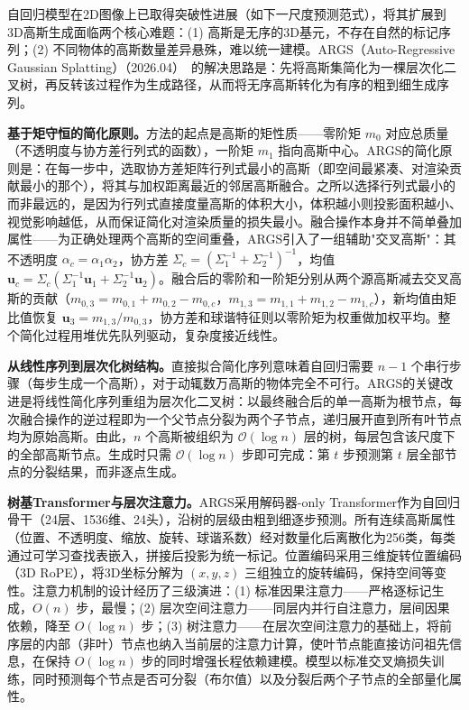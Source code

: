 自回归模型在2D图像上已取得突破性进展（如下一尺度预测范式），将其扩展到3D高斯生成面临两个核心难题：(1) 高斯是无序的3D基元，不存在自然的标记序列；(2) 不同物体的高斯数量差异悬殊，难以统一建模。ARGS（Auto-Regressive Gaussian Splatting）（2026.04）~\cite{2604_00494}的解决思路是：先将高斯集简化为一棵层次化二叉树，再反转该过程作为生成路径，从而将无序高斯转化为有序的粗到细生成序列。

\textbf{基于矩守恒的简化原则。}方法的起点是高斯的矩性质——零阶矩 $m_0$ 对应总质量（不透明度与协方差行列式的函数），一阶矩 $m_1$ 指向高斯中心。ARGS的简化原则是：在每一步中，选取协方差矩阵行列式最小的高斯（即空间最紧凑、对渲染贡献最小的那个），将其与加权距离最近的邻居高斯融合。之所以选择行列式最小的而非最远的，是因为行列式直接度量高斯的体积大小，体积越小则投影面积越小、视觉影响越低，从而保证简化对渲染质量的损失最小。融合操作本身并不简单叠加属性——为正确处理两个高斯的空间重叠，ARGS引入了一组辅助"交叉高斯"：其不透明度 $\alpha_c = \alpha_1 \alpha_2$，协方差 $\Sigma_c = (\Sigma_1^{-1} + \Sigma_2^{-1})^{-1}$，均值 $\mathbf{u}_c = \Sigma_c(\Sigma_1^{-1}\mathbf{u}_1 + \Sigma_2^{-1}\mathbf{u}_2)$。融合后的零阶和一阶矩分别从两个源高斯减去交叉高斯的贡献（$m_{0,3} = m_{0,1} + m_{0,2} - m_{0,c}$，$m_{1,3} = m_{1,1} + m_{1,2} - m_{1,c}$），新均值由矩比值恢复 $\mathbf{u}_3 = m_{1,3}/m_{0,3}$，协方差和球谐特征则以零阶矩为权重做加权平均。整个简化过程用堆优先队列驱动，复杂度接近线性。

\textbf{从线性序列到层次化树结构。}直接拟合简化序列意味着自回归需要 $n-1$ 个串行步骤（每步生成一个高斯），对于动辄数万高斯的物体完全不可行。ARGS的关键改进是将线性简化序列重组为层次化二叉树：以最终融合后的单一高斯为根节点，每次融合操作的逆过程即为一个父节点分裂为两个子节点，递归展开直到所有叶节点均为原始高斯。由此，$n$ 个高斯被组织为 $\mathcal{O}(\log n)$ 层的树，每层包含该尺度下的全部高斯节点。生成时只需 $\mathcal{O}(\log n)$ 步即可完成：第 $t$ 步预测第 $t$ 层全部节点的分裂结果，而非逐点生成。

\textbf{树基Transformer与层次注意力。}ARGS采用解码器-only Transformer作为自回归骨干（24层、1536维、24头），沿树的层级由粗到细逐步预测。所有连续高斯属性（位置、不透明度、缩放、旋转、球谐系数）经对数量化后离散化为256类，每类通过可学习查找表嵌入，拼接后投影为统一标记。位置编码采用三维旋转位置编码（3D RoPE），将3D坐标分解为 $(x, y, z)$ 三组独立的旋转编码，保持空间等变性。注意力机制的设计经历了三级演进：(1) 标准因果注意力——严格逐标记生成，$O(n)$ 步，最慢；(2) 层次空间注意力——同层内并行自注意力，层间因果依赖，降至 $O(\log n)$ 步；(3) 树注意力——在层次空间注意力的基础上，将前序层的内部（非叶）节点也纳入当前层的注意力计算，使叶节点能直接访问祖先信息，在保持 $O(\log n)$ 步的同时增强长程依赖建模。模型以标准交叉熵损失训练，同时预测每个节点是否可分裂（布尔值）以及分裂后两个子节点的全部量化属性。

